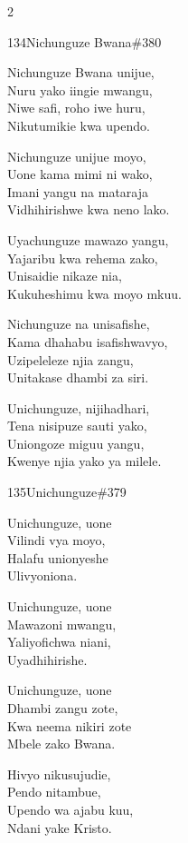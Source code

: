 \documentclass{article}
\begin{document}
\begin{multicols}{2}
\begin{hymn}{134}{Nichunguze Bwana}{\#380}
\begin{stanza}
Nichunguze Bwana unijue,\\
Nuru yako iingie mwangu,\\
Niwe safi, roho iwe huru,\\
Nikutumikie kwa upendo.
\end{stanza}
\begin{stanza}
Nichunguze unijue moyo,\\
Uone kama mimi ni wako,\\
Imani yangu na mataraja\\
Vidhihirishwe kwa neno lako.
\end{stanza}
\begin{stanza}
Uyachunguze mawazo yangu,\\
Yajaribu kwa rehema zako,\\
Unisaidie nikaze nia,\\
Kukuheshimu kwa moyo mkuu.
\end{stanza}
\begin{stanza}
Nichunguze na unisafishe,\\
Kama dhahabu isafishwavyo,\\
Uzipeleleze njia zangu,\\
Unitakase dhambi za siri.
\end{stanza}
\begin{stanza}
Unichunguze, nijihadhari,\\
Tena nisipuze sauti yako,\\
Uniongoze miguu yangu,\\
Kwenye njia yako ya milele.
\end{stanza}
\end{hymn}

\begin{hymn}{135}{Unichunguze}{\#379}
\begin{stanza}
Unichunguze, uone\\
Vilindi vya moyo,\\
Halafu unionyeshe\\
Ulivyoniona.
\end{stanza}
\begin{stanza}
Unichunguze, uone\\
Mawazoni mwangu,\\
Yaliyofichwa niani,\\
Uyadhihirishe.
\end{stanza}
\begin{stanza}
Unichunguze, uone\\
Dhambi zangu zote,\\
Kwa neema nikiri zote\\
Mbele zako Bwana.
\end{stanza}
\begin{stanza}
Hivyo nikusujudie,\\
Pendo nitambue,\\
Upendo wa ajabu kuu,\\
Ndani yake Kristo.
\end{stanza}
\end{hymn}


\end{multicols}
\end{document}
